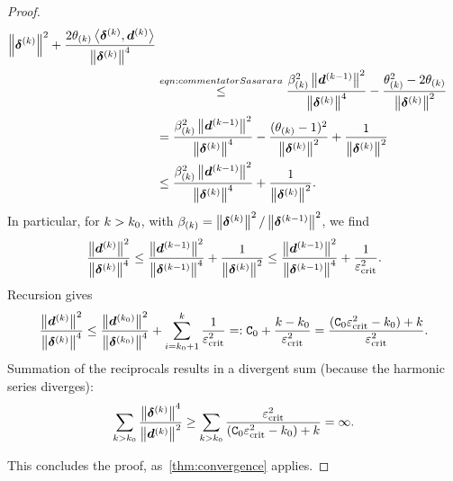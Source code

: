\documentclass{article}
\theoremstyle{plain}
\theoremstyle{definition}
\begin{document}
\begin{proof}
\begin{align}
{			\left\|\bm{\delta}^{(k)}\right\|^2
		}
		+ 
		\frac{
			2\theta_{(k)}\left\langle \bm{\delta}^{(k)}, \bm{d}^{(k)} \right\rangle
		}{
			\left\|\bm{\delta}^{(k)}\right\|^4
		}
		\nonumber
		\\
		&\stackrel{eqn:commentatorSasarara}\leq
		\frac{
			\beta_{(k)}^2\left\|\bm{d}^{(k-1)}\right\|^2
		}{
			\left\|\bm{\delta}^{(k)}\right\|^4
		}
		-
		\frac{
			\theta_{(k)}^2 - 2 \theta_{(k)}
		}{
			\left\|\bm{\delta}^{(k)}\right\|^2
		}
		\nonumber
		\\
		&=
		\frac{
			\beta_{(k)}^2\left\|\bm{d}^{(k-1)}\right\|^2
		}{
			\left\|\bm{\delta}^{(k)}\right\|^4
		}
		-
		\frac{
			(\theta_{(k)} -1)^2
		}{
			\left\|\bm{\delta}^{(k)}\right\|^2
		}
		+
		\frac{1}{\left\|\bm{\delta}^{(k)}\right\|^2}
		\nonumber
		\\
		&\leq
		\frac{
			\beta_{(k)}^2\left\|\bm{d}^{(k-1)}\right\|^2
		}{
			\left\|\bm{\delta}^{(k)}\right\|^4
		}
		+
		\frac{1}{\left\|\bm{\delta}^{(k)}\right\|^2}.
		\label{eqn:recalcitratedLinearly}
	\end{align}
	In particular, for $k > k_0$, with
	$\beta_{(k)} = \left\|\bm{\delta}^{(k)}\right\|^2 / \left\|\bm{\delta}^{(k-1)}\right\|^2$,
	we find
	$$
	\frac{\left\|\bm{d}^{(k)}\right\|^2}{\left\|\bm{\delta}^{(k)}\right\|^4}
	\leq
	\frac{\left\|\bm{d}^{(k-1)}\right\|^2}{\left\|\bm{\delta}^{(k-1)}\right\|^4}
	+ \frac{1}{\left\|\bm{\delta}^{(k)}\right\|^2}
	\leq
	\frac{\left\|\bm{d}^{(k-1)}\right\|^2}{\left\|\bm{\delta}^{(k-1)}\right\|^4}
	+ \frac{1}{\varepsilon_{\mathrm{crit}}^2}.
	$$
	Recursion gives
	$$
	\frac{\left\|\bm{d}^{(k)}\right\|^2}{\left\|\bm{\delta}^{(k)}\right\|^4}
	\leq
	\frac{\left\|\bm{d}^{(k_0)}\right\|^2}{\left\|\bm{\delta}^{(k_0)}\right\|^4}
	+
	\sum_{i=k_0 + 1}^k
	\frac{1}{\varepsilon_{\mathrm{crit}}^2}
	=:
	\mathtt C_0
	+
	\frac{k - k_0}{\varepsilon_{\mathrm{crit}}^2}
	=
	\frac{(\mathtt C_0 \varepsilon_{\mathrm{crit}}^2 - k_0) + k}{\varepsilon_{\mathrm{crit}}^2}.
	$$
	Summation of the reciprocals results in a 
	divergent sum (because the harmonic series diverges):
	$$
	\sum_{k>k_0}
	\frac{\left\|\bm{\delta}^{(k)}\right\|^4}{\left\|\bm{d}^{(k)}\right\|^2}
	\geq 
	\sum_{k>k_0}
	\frac{
		\varepsilon_{\mathrm{crit}}^2
		}{
		(\mathtt C_0 \varepsilon_{\mathrm{crit}}^2 - k_0) + k
	}
	= \infty.
	$$

	This concludes the proof, as~\cref{thm:convergence} applies.
\end{proof}
\end{document}

